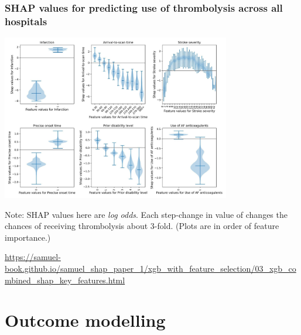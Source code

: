 \documentclass[xcolor={usenames,dvipsnames}]{beamer}
\newcommand{\smallurl}[1]{\textcolor{blue}{\fontsize{4pt}{4.8pt}\selectfont \url{#1}}}
\begin{document}

\begin{frame}
\frametitle{SHAP values for predicting use of thrombolysis across all hospitals}



\vspace{-0.5em}

\begin{center}
    \includegraphics[width=0.75\textwidth]{./images/shap_violins}
\end{center}


\tiny{Note: SHAP values here are \emph{log odds}. Each step-change in value of  changes the chances of receiving thrombolysis about 3-fold. (Plots are in order of feature importance.)}


\smallurl{https://samuel-book.github.io/samuel_shap_paper_1/xgb_with_feature_selection/03_xgb_combined_shap_key_features.html}

\end{frame}






\section{Outcome modelling}


\end{document}
